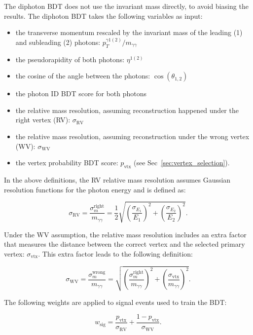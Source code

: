 The diphoton BDT does not use the invariant mass directly, to avoid biasing the results. The diphoton BDT takes the following variables as input:

\begin{itemize}
    \item the transverse momentum rescaled by the invariant mass of the leading (1) and subleading (2) photons: $p_T^{\gamma 1(2)} / m_{\gamma\gamma}$
    \item the pseudorapidity of both photons: $\eta^{1(2)}$
    \item the cosine of the angle between the photons: $\cos(\theta_{1,2})$
    \item the photon ID BDT score for both photons
    \item the relative mass resolution, assuming reconstruction happened under the right vertex (RV): $\sigma_{\mathrm{RV}}$
    \item the relative mass resolution, assuming reconstruction under the wrong vertex (WV): $\sigma_{\mathrm{WV}}$
    \item the vertex probability BDT score: $p_{\mathrm{vtx}}$ (see Sec~\ref{sec:vertex_selection}).
\end{itemize}

In the above definitions, the RV relative mass resolution assumes Gaussian resolution functions for the photon energy and is defined as:

\begin{equation}
    \sigma_{\mathrm{RV}} = \frac{\sigma_{m}^{\mathrm{right}}}{m_{\gamma\gamma}} = \frac{1}{2} \sqrt{\left(\frac{\sigma_{E_1}}{E_1}\right)^2 + \left(\frac{\sigma_{E_2}}{E_2}\right)^2}.
\end{equation}

Under the WV assumption, the relative mass resolution includes an extra factor that measures the distance between the correct vertex and the selected primary vertex: $\sigma_{\mathrm{vtx}}$. This extra factor leads to the following definition:

\begin{equation}
    \sigma_{\mathrm{WV}} = \frac{\sigma_m^{\mathrm{wrong}}}{m_{\gamma\gamma}} = \sqrt{\left(\frac{\sigma_m^{\mathrm{right}}}{m_{\gamma\gamma}}\right)^2 + \left(\frac{\sigma_{\mathrm{vtx}}}{m_{\gamma\gamma}}\right)^2}.
\end{equation}

The following weights are applied to signal events used to train the BDT:

\begin{equation}
    w_{\mathrm{sig}} = \frac{p_{\mathrm{vtx}}}{\sigma_{\mathrm{RV}}} + \frac{1 - p_{\mathrm{vtx}}}{\sigma_{\mathrm{WV}}}.
\end{equation}

